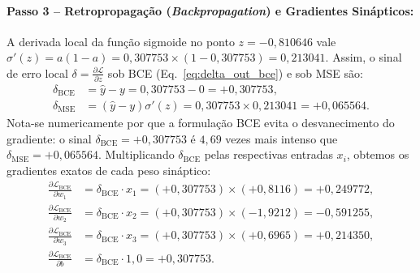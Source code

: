﻿\documentclass[runningheads]{llncs}
\begin{document}
\paragraph{Passo 3 -- Retropropaga\c{c}\~{a}o (\textit{Backpropagation}) e Gradientes Sin\'{a}pticos:}
A derivada local da fun\c{c}\~{a}o sigmoide no ponto $z = -0{,}810646$ vale $\sigma'(z) = a(1 - a) = 0{,}307753 \times (1 - 0{,}307753) = 0{,}213041$. Assim, o sinal de erro local $\delta = \frac{\partial \mathcal{L}}{\partial z}$ sob BCE (Eq.~\eqref{eq:delta_out_bce}) e sob MSE s\~{a}o:
\begin{align}
    \delta_{\text{BCE}} &= \hat{y} - y = 0{,}307753 - 0 = +0{,}307753, \nonumber\\
    \delta_{\text{MSE}} &= (\hat{y} - y)\sigma'(z) = 0{,}307753 \times 0{,}213041 = +0{,}065564.
\end{align}
Nota-se numericamente por que a formula\c{c}\~{a}o BCE evita o desvanecimento do gradiente: o sinal $\delta_{\text{BCE}} = +0{,}307753$ \'{e} $4{,}69$ vezes mais intenso que $\delta_{\text{MSE}} = +0{,}065564$. Multiplicando $\delta_{\text{BCE}}$ pelas respectivas entradas $x_i$, obtemos os gradientes exatos de cada peso sin\'{a}ptico:
\begin{align}
    \frac{\partial \mathcal{L}_{\text{BCE}}}{\partial w_1} &= \delta_{\text{BCE}} \cdot x_1 = (+0{,}307753) \times (+0{,}8116) = +0{,}249772, \nonumber\\
    \frac{\partial \mathcal{L}_{\text{BCE}}}{\partial w_2} &= \delta_{\text{BCE}} \cdot x_2 = (+0{,}307753) \times (-1{,}9212) = -0{,}591255, \nonumber\\
    \frac{\partial \mathcal{L}_{\text{BCE}}}{\partial w_3} &= \delta_{\text{BCE}} \cdot x_3 = (+0{,}307753) \times (+0{,}6965) = +0{,}214350, \nonumber\\
    \frac{\partial \mathcal{L}_{\text{BCE}}}{\partial b} &= \delta_{\text{BCE}} \cdot 1{,}0 = +0{,}307753.
\end{align}
\end{document}
